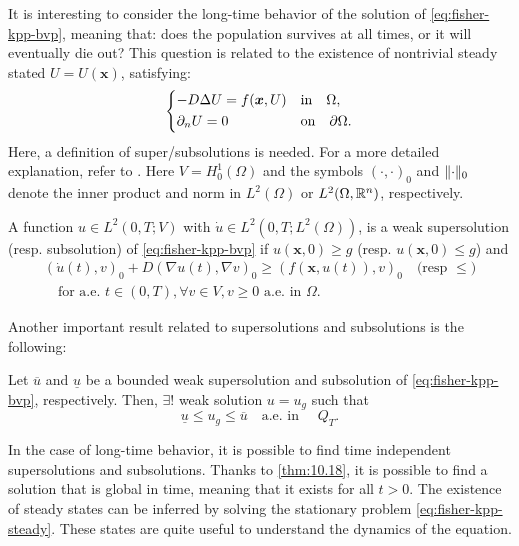 It is interesting to consider the long-time behavior of the solution of \eqref{eq:fisher-kpp-bvp}, meaning that: does the population survives at all times, or it will eventually die out? This question is related to the existence of nontrivial steady stated \(U = U(\bm{x})\), satisfying:
\begin{equation}
    \begin{dcases}
        -D \Delta U = f(\bm{x}, U) & \text{in} \quad \Omega, \\
        \partial_{n}U = 0 & \text{on} \quad \partial \Omega.
    \end{dcases}
    \label{eq:fisher-kpp-steady} 
\end{equation}
Here, a definition of super/subsolutions is needed. For a more detailed explanation, refer to \cite{SalsaVerziniPDE}. Here \(V = H^1_0(\Omega)\) and the symbols \(\left(\cdot, \cdot\right)_0\) and \(\lVert\cdot\rVert_0\) denote the inner product and norm in \(L^2(\Omega)\) or \(L^2(\Omega, \mathbb{R}^n)\), respectively. 
\begin{definition}
    A function \(u \in L^2(0, T; V)\) with \(\dot{u} \in L^2(0, T; L^2(\Omega))\), is a weak supersolution (resp. subsolution) of \eqref{eq:fisher-kpp-bvp} if \(u(\bm{x}, 0) \geq g\) (resp. \(u(\bm{x}, 0) \leq g\)) and
    \begin{equation}
        \begin{split}
            \left(\dot{u}(t), v\right)_0 + D \left(\nabla u(t), \nabla v\right)_0 \geq (f(\bm{x}, u(t)), v)_0 \quad \text{(resp } \leq \text{)} \\ \quad \text{for a.e. } t \in (0, T), \forall v \in V, v \geq 0 \text{ a.e. in } \Omega.
        \end{split}
    \end{equation}
\end{definition}
Another important result related to supersolutions and subsolutions is the following:
\begin{theorem}
    Let \(\overline{u}\) and \(\underline{u}\) be a bounded weak supersolution and subsolution of \eqref{eq:fisher-kpp-bvp}, respectively. Then, \(\exists!\) weak solution \(u = u_g\) such that
    \begin{equation}
        \underline{u} \leq u_g \leq \overline{u} \quad \text{a.e. in } \quad Q_T.
    \end{equation}
    \label{thm:10.18}
\end{theorem}

In the case of long-time behavior, it is possible to find time independent supersolutions and subsolutions. Thanks to \ref{thm:10.18}, it is possible to find a solution that is global in time, meaning that it exists for all \(t > 0\). 
The existence of steady states can be inferred by solving the stationary problem \eqref{eq:fisher-kpp-steady}. These states are quite useful to understand the dynamics of the equation.


